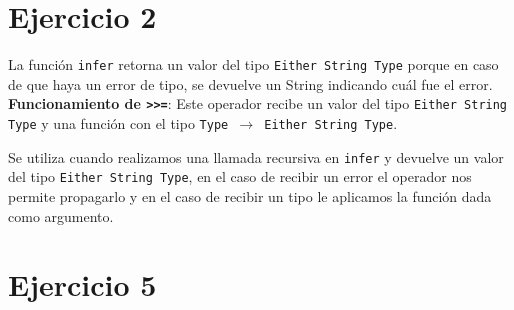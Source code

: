 \documentclass[11pt]{article}
\begin{document}

\section*{Ejercicio 2}

La función \texttt{infer} retorna un valor del tipo \texttt{Either String Type}
porque en caso de que haya un error de tipo, se devuelve un String indicando
cuál fue el error. \\

\textbf{Funcionamiento de \texttt{>>=}}:
Este operador recibe un valor del tipo \texttt{Either String Type} y una función
con el tipo \texttt{Type $\rightarrow$ Either String Type}.

Se utiliza cuando realizamos una llamada recursiva en \texttt{infer} y
devuelve un valor del tipo \texttt{Either String Type}, en el caso
de recibir un error el operador nos permite propagarlo y en el caso de recibir
un tipo le aplicamos la función dada como argumento.


\section*{Ejercicio 5}


\begin{prooftree}







\end{prooftree}
\end{document}
